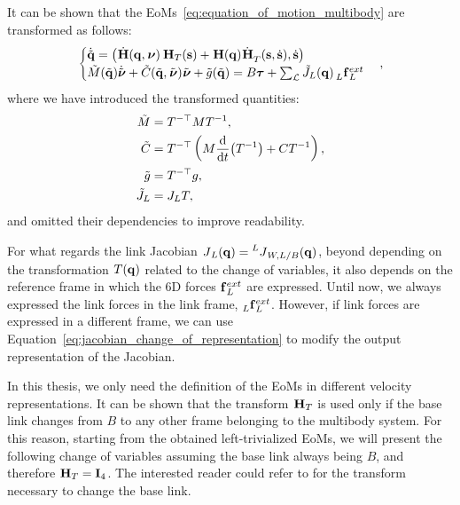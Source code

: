 It can be shown that the \acp{EoM}~\eqref{eq:equation_of_motion_multibody} are transformed as follows:
%
\begin{equation*}
    \begin{cases}
        \dot{\tilde{\Qu}} = \left( \homod(\Qu, \Nu) \homo_T(\Shape) + \homo(\Qu) \dot{\homo}_T(\Shape, \Shaped), \Shaped \right) \\
        \tilde{M}(\tilde{\Qu}) \dot{\tilde{\boldsymbol{\nu}}} + \tilde{C}(\tilde{\Qu}, \tilde{\Nu}) \tilde{\Nu} + \tilde{g}(\tilde{\Qu}) = B \Torques + \sum_{\mathcal{L}} \tilde{J}_L(\Qu) \forcesix[L]_L^{ext}
    \end{cases}
    ,
\end{equation*}
%
where we have introduced the transformed quantities:
%
\begin{equation}
    \label{eq:eom_change_of_variables}
    \begin{aligned}
        \tilde{M} &= T^{-\top} M T^{-1} ,\\
        \tilde{C} &= T^{-\top} \left( M \dv{t}(T^{-1}) + CT^{-1} \right) ,\\
        \tilde{g} &= T^{-\top} g ,\\
        \tilde{J}_L &= J_L T,
    \end{aligned}  
\end{equation}
%
and omitted their dependencies to improve readability.

\begin{remark}
%
For what regards the link Jacobian $\jac_L(\Qu) = \jac[L]_{W,L/B}(\Qu)$, beyond depending on the transformation $T(\Qu)$ related to the change of variables, it also depends on the reference frame in which the 6D forces $\forcesix^{ext}_L$ are expressed.
Until now, we always expressed the link forces in the link frame, \ie $\forcesix[L]^{ext}_L$.
However, if link forces are expressed in a different frame, we can use Equation~\eqref{eq:jacobian_change_of_representation} to modify the output representation of the Jacobian.
%
\end{remark}

In this thesis, we only need the definition of the \acp{EoM} in different velocity representations.
It can be shown that the transform $\homo_T$ is used only if the base link changes from $B$ to any other frame belonging to the multibody system.
For this reason, starting from the obtained left-trivialized \acp{EoM}, we will present the following change of variables assuming the base link always being $B$, and therefore $\homo_T = \eye_4$.
The interested reader could refer to \parencite{traversaro_modelling_2017} for the transform necessary to change the base link.

